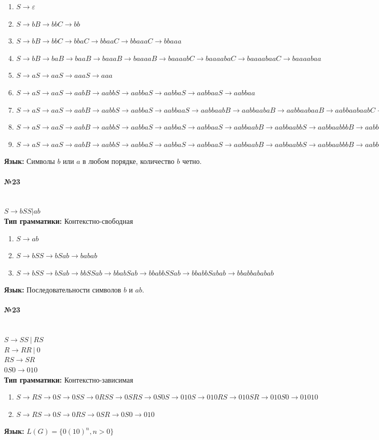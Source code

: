 \documentclass[12pt,onecolumn]{article}
\newcommand{\nparagraph}[1]{\paragraph{#1}\mbox{}\\}
\begin{document}
\begin{enumerate}
    \item $S \to \varepsilon$
    \item $S \to bB \to bbC \to bb$
    \item $S \to bB \to bbC \to bbaC \to bbaaC \to bbaaaC \to bbaaa$
    \item $S \to bB \to baB \to baaB \to baaaB \to baaaaB \to baaaabC \to baaaabaC \to baaaabaaC \to baaaabaa$
    \item $S \to aS \to aaS \to aaaS \to aaa$
    \item $S \to aS \to aaS \to aabB \to aabbS \to aabbaS \to aabbaS \to aabbaaS \to aabbaa$
    \item $S \to aS \to aaS \to aabB \to aabbS \to aabbaS \to aabbaaS \to aabbaabB\to aabbaabaB \to aabbaabaaB \to aabbaabaabC \to aabbaabaab$
    \item $S \to aS \to aaS \to aabB \to aabbS \to aabbaS \to aabbaS \to aabbaaS \to aabbaabB \to aabbaabbS \to aabbaabbbB \to aabbaabbbbC \to aabbaabbbb$
    \item $S \to aS \to aaS \to aabB \to aabbS \to aabbaS \to aabbaS \to aabbaaS \to aabbaabB \to aabbaabbS \to aabbaabbbB \to aabbaabbbbC \to aabbaabbbbaC \to aabbaabbbbaaC \to aabbaabbbbaaaC \to aabbaabbbbaaa$
\end{enumerate}
\textbf{Язык:} Символы $b$ или $a$ в любом порядке, количество $b$ четно. 
\nparagraph{№23}
$S \to bSS | ab$\\
\textbf{Тип грамматики: } Контекстно-свободная
\begin{enumerate}
    \item $S \to ab$
    \item $S \to bSS \to bSab \to babab$
    \item $S \to bSS \to bSab \to bbSSab \to bbabSab \to bbabbSSab \to bbabbSabab \to bbabbababab$
\end{enumerate}
\textbf{Язык: } Последовательности символов $b$ и $ab$.
\nparagraph{№23} 
$S \to SS~ |~ RS$\\
$R \to RR~ |~ 0$\\
$RS \to SR$\\
$0S0 \to 010$\\
\textbf{Тип грамматики: } Контекстно-зависимая\\
\begin{enumerate}
    \item $S \to RS \to 0S \to 0SS\to 0RSS\to 0SRS \to 0S0S \to 010S \to 010RS \to 010SR \to 010S0 \to 01010$
    \item $S \to RS \to 0S \to 0RS\to 0SR \to 0S0 \to 010$
\end{enumerate}
\textbf{Язык: }  $L(G) = \{0(10)^n, n > 0\}$
\end{document}
